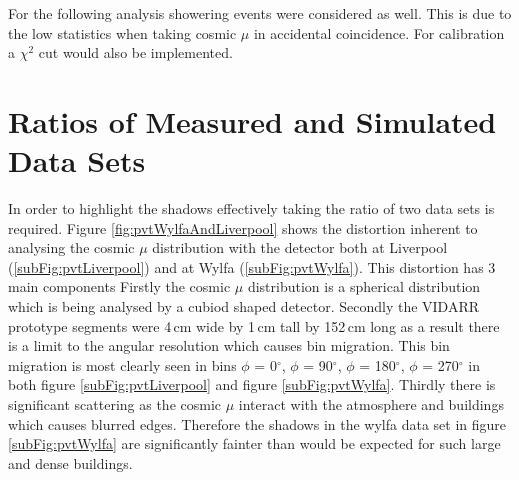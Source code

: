 \documentclass[12pt,a4paper]{article}
\begin{document}
For the following analysis showering events were considered as well. This is due to the low statistics when taking cosmic $\mu$ in accidental coincidence. For calibration a $\chi^2$ cut would also be implemented. 

\section{Ratios of Measured and Simulated Data Sets} \label{sec:RatiosOfMeasuredAndSimulatedDataSets}
In order to highlight the shadows effectively taking the ratio of two data sets is required. Figure \ref{fig:pvtWylfaAndLiverpool} shows the distortion inherent to analysing the cosmic $\mu$ distribution with the detector both at Liverpool (\ref{subFig:pvtLiverpool}) and at Wylfa (\ref{subFig:pvtWylfa}). This distortion has 3 main components Firstly the cosmic $\mu$ distribution is a spherical distribution which is being analysed by a cubiod shaped detector. Secondly the VIDARR prototype segments were 4\,cm wide by 1\,cm tall by 152\,cm long as a result there is a limit to the angular resolution which causes bin migration. This bin migration is most clearly seen in bins $\phi$ = 0$^\circ$, $\phi$ =  90$^\circ$, $\phi$ = 180$^\circ$, $\phi$ = 270$^\circ$ in both figure \ref{subFig:pvtLiverpool} and figure \ref{subFig:pvtWylfa}. Thirdly there is significant scattering as the cosmic $\mu$ interact with the atmosphere and buildings which causes blurred edges. Therefore the shadows in the wylfa data set in figure \ref{subFig:pvtWylfa} are significantly fainter than would be expected for such large and dense buildings.  
\end{document}
